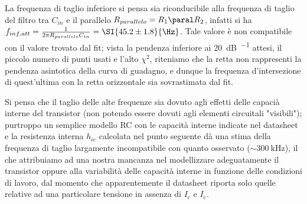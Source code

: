 La frequenza di taglio inferiore si pensa sia riconducibile alla frequenza di taglio del filtro tra $C_{in}$ e il parallelo $R_{parallelo }= R_1 \paral R_2 $, infatti si ha $f_{inf,att}= \frac{1}{2 \pi R_{parallelo}C_{in}}= \SI{45.2 \pm 1.8}{\Hz}$. Tale valore è non compatibile con il valore trovato dal fit; vista la pendenza inferiore ai \SI{20}{\dB\per\deca} attesi, il piccolo numero di punti usati e l'alto $\chi^2$, riteniamo che la retta non rappresenti la pendenza asintotica della curva di guadagno, e dunque la frequenza d'intersezione di quest'ultima con la retta orizzontale sia sovrastimata dal fit.

Si pensa che il taglio delle alte frequenze sia dovuto agli effetti delle capacià interne del transistor (non potendo essere dovuti agli elementi circuitali "visibili"); purtroppo un semplice modello RC con le capacità interne indicate nel datasheet e la resistenza interna $h_{ie}$ calcolata nel punto seguente dà una stima della frequenza di taglio largamente incompatibile con quanto osservato ($\sim \SI{300}{\kHz}$), il che attribuiamo ad una nostra mancanza nel modellizzare adeguatamente il transistor oppure alla variabilità delle capacità interne in funzione delle condizioni di lavoro, dal momento che apparentemente il datasheet riporta solo quelle relative ad una particolare tensione in assenza di $I_c$ e $I_e$.
